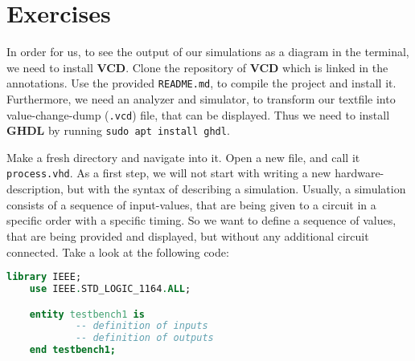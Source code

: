 \documentclass{dcbl/challenge}
\begin{document}
\section*{Exercises}
\begin{aufgabe}
    In order for us, to see the output of our simulations as a diagram in the terminal, we need to install \textbf{VCD}.
    Clone the repository of \textbf{VCD} which is linked in the annotations.
    Use the provided \texttt{README.md}, to compile the project and install it.
    Furthermore, we need an analyzer and simulator, to transform our textfile into value-change-dump (\texttt{.vcd}) file, that can be displayed.
    Thus we need to install \textbf{GHDL} by running \texttt{sudo apt install ghdl}.
\end{aufgabe}
\begin{aufgabe}
    Make a fresh directory and navigate into it. 
    Open a new file, and call it \texttt{process.vhd}.
    As a first step, we will not start with writing a new hardware-description, but with the syntax of describing a simulation.
    Usually, a simulation consists of a sequence of input-values, that are being given to a circuit in a specific order with a specific timing.
    So we want to define a sequence of values, that are being provided and displayed, but without any additional circuit connected.
    Take a look at the following code:
    \begin{lstlisting}[language=VHDL]
    library IEEE;
    use IEEE.STD_LOGIC_1164.ALL;

    entity testbench1 is
            -- definition of inputs
            -- definition of outputs
    end testbench1;


\end{lstlisting}
\end{aufgabe}
\end{document}
